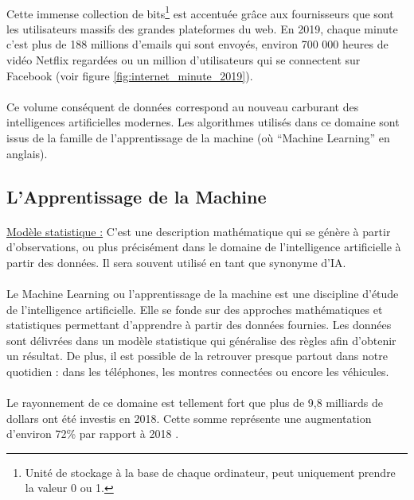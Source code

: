 \documentclass[10pt, french, a4paper]{report}
\begin{document}
\paragraph{}
Cette immense collection de bits\footnote{Unité de stockage à la base de chaque ordinateur, peut uniquement prendre la valeur 0 ou 1.} est accentuée grâce aux fournisseurs que sont les utilisateurs massifs des grandes plateformes du web. En 2019, chaque minute c'est plus de 188 millions d'emails qui sont envoyés, environ 700 000 heures de vidéo Netflix regardées ou un million d'utilisateurs qui se connectent sur Facebook (voir figure \ref{fig:internet_minute_2019}).


\paragraph{}
Ce volume conséquent de données correspond au nouveau carburant des intelligences artificielles modernes. Les algorithmes utilisés dans ce domaine sont issus de la famille de l'apprentissage de la machine (où ``Machine Learning'' en anglais).

\subsection{L'Apprentissage de la Machine}

\paragraph{}
\underline{Modèle statistique :} C’est une description mathématique qui se génère à partir d’observations, ou plus précisément dans le domaine de l’intelligence artificielle à partir des données. Il sera souvent utilisé en tant que synonyme d’IA.

\paragraph{}
Le Machine Learning ou l'apprentissage de la machine est une discipline d'étude de l'intelligence artificielle. Elle se fonde sur des approches mathématiques et statistiques permettant d'apprendre à partir des données fournies. Les données sont délivrées dans un modèle statistique qui généralise des règles afin d'obtenir un résultat. De plus, il est possible de la retrouver presque partout dans notre quotidien : dans les téléphones, les montres connectées ou encore les véhicules.

\paragraph{}
Le rayonnement de ce domaine est tellement fort que plus de 9,8 milliards de dollars ont été investis en 2018. Cette somme représente une augmentation d'environ 72\% par rapport à 2018 \citep{columbus_25_2019}.
\end{document}
